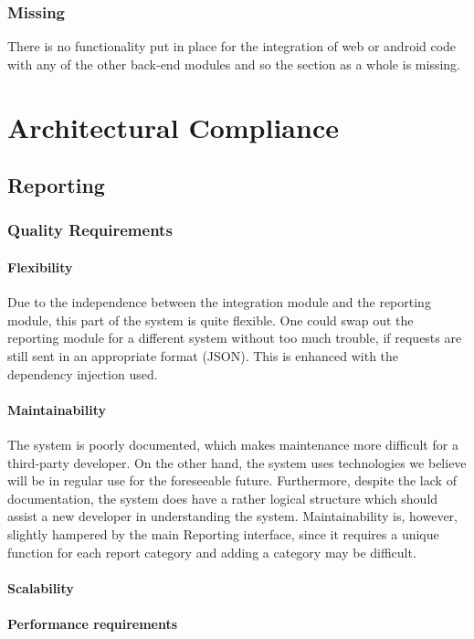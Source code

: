 \documentclass{article}
\begin{document}
        \subsubsection{Missing}
        There is no functionality put in place for the integration of web or android code with any of the other back-end modules and so the section as a whole is missing.

\section{Architectural Compliance}
    \subsection{Reporting}
        \subsubsection{Quality Requirements}
            \paragraph{Flexibility}
            Due to the independence between the integration module and the reporting module, this part of the system is quite flexible. One could swap out the reporting module for a different system without too much trouble, if requests are still sent in an appropriate format (JSON). This is enhanced with the dependency injection used.
            \paragraph{Maintainability}
            The system is poorly documented, which makes maintenance more difficult for a third-party developer. On the other hand, the system uses technologies we believe will be in regular use for the foreseeable future. Furthermore, despite the lack of documentation, the system does have a rather logical structure which should assist a new developer in understanding the system. Maintainability is, however, slightly hampered by the main Reporting interface, since it requires a unique function for each report category and adding a category may be difficult.
            \paragraph{Scalability}
            \paragraph{Performance requirements}
\end{document}
